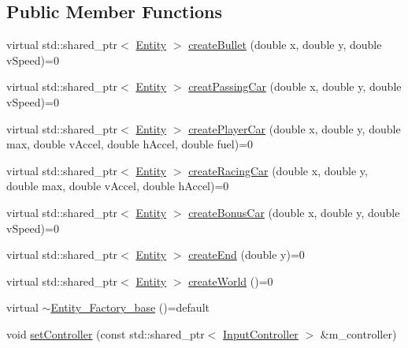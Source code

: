 \subsection*{Public Member Functions}
\begin{DoxyCompactItemize}
\item 
virtual std\+::shared\+\_\+ptr$<$ \hyperlink{classroadfighter_1_1Entity}{Entity} $>$ \hyperlink{classroadfighter_1_1Entity__Factory__base_a5241bdb886a9f1b086d009a0f6478045}{create\+Bullet} (double x, double y, double v\+Speed)=0
\item 
virtual std\+::shared\+\_\+ptr$<$ \hyperlink{classroadfighter_1_1Entity}{Entity} $>$ \hyperlink{classroadfighter_1_1Entity__Factory__base_aa21b8cb23696844b7349ccf2c87d10fa}{creat\+Passing\+Car} (double x, double y, double v\+Speed)=0
\item 
virtual std\+::shared\+\_\+ptr$<$ \hyperlink{classroadfighter_1_1Entity}{Entity} $>$ \hyperlink{classroadfighter_1_1Entity__Factory__base_a3021f69b62b9df33706096381664d58f}{create\+Player\+Car} (double x, double y, double max, double v\+Accel, double h\+Accel, double fuel)=0
\item 
virtual std\+::shared\+\_\+ptr$<$ \hyperlink{classroadfighter_1_1Entity}{Entity} $>$ \hyperlink{classroadfighter_1_1Entity__Factory__base_a17b9c30501b8a11624bee8f1c24a6b7e}{create\+Racing\+Car} (double x, double y, double max, double v\+Accel, double h\+Accel)=0
\item 
virtual std\+::shared\+\_\+ptr$<$ \hyperlink{classroadfighter_1_1Entity}{Entity} $>$ \hyperlink{classroadfighter_1_1Entity__Factory__base_a888f537d2deed2d90a391c1900e9fdb6}{create\+Bonus\+Car} (double x, double y, double v\+Speed)=0
\item 
virtual std\+::shared\+\_\+ptr$<$ \hyperlink{classroadfighter_1_1Entity}{Entity} $>$ \hyperlink{classroadfighter_1_1Entity__Factory__base_a791574991ccbe7ff95f28e5651ed2cb1}{create\+End} (double y)=0
\item 
virtual std\+::shared\+\_\+ptr$<$ \hyperlink{classroadfighter_1_1Entity}{Entity} $>$ \hyperlink{classroadfighter_1_1Entity__Factory__base_aa24de6bbeb80c25e96f3e24d6bcb5169}{create\+World} ()=0
\item 
virtual \hyperlink{classroadfighter_1_1Entity__Factory__base_a19ec21ceb4fd132712ef1bf131b4be9b}{$\sim$\+Entity\+\_\+\+Factory\+\_\+base} ()=default
\item 
void \hyperlink{classroadfighter_1_1Entity__Factory__base_a6c9363d763f34f39a44eaf02c6cb9f87}{set\+Controller} (const std\+::shared\+\_\+ptr$<$ \hyperlink{classroadfighter_1_1InputController}{Input\+Controller} $>$ \&m\+\_\+controller)

\end{DoxyCompactItemize}
